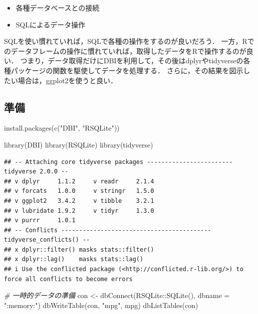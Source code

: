 \documentclass[
]{article}
\newenvironment{Shaded}{\begin{snugshade}}{\end{snugshade}}
\newcommand{\AttributeTok}[1]{\textcolor[rgb]{0.77,0.63,0.00}{#1}}
\newcommand{\CommentTok}[1]{\textcolor[rgb]{0.56,0.35,0.01}{\textit{#1}}}
\newcommand{\FunctionTok}[1]{\textcolor[rgb]{0.00,0.00,0.00}{#1}}
\newcommand{\NormalTok}[1]{#1}
\newcommand{\OtherTok}[1]{\textcolor[rgb]{0.56,0.35,0.01}{#1}}
\newcommand{\SpecialCharTok}[1]{\textcolor[rgb]{0.00,0.00,0.00}{#1}}
\newcommand{\StringTok}[1]{\textcolor[rgb]{0.31,0.60,0.02}{#1}}
\providecommand{\tightlist}{%
  \setlength{\itemsep}{0pt}\setlength{\parskip}{0pt}}
\begin{document}
\begin{itemize}
\tightlist
\item
  各種データベースとの接続\\
\item
  SQLによるデータ操作
\end{itemize}

SQLを使い慣れていれば，SQLで各種の操作をするのが良いだろう．
一方，Rでのデータフレームの操作に慣れていれば，取得したデータをRで操作するのが良い．
つまり，データ取得だけにDBIを利用して，その後はdplyrやtidyverseの各種パッケージの関数を駆使してデータを処理する．
さらに，その結果を図示したい場合は，ggplot2を使うと良い．

\hypertarget{ux6e96ux5099-5}{%
\subsection{準備}\label{ux6e96ux5099-5}}

\begin{Shaded}
\begin{Highlighting}[]
\FunctionTok{install.packages}\NormalTok{(}\FunctionTok{c}\NormalTok{(}\StringTok{"DBI"}\NormalTok{, }\StringTok{"RSQLite"}\NormalTok{))}
\end{Highlighting}
\end{Shaded}

\begin{Shaded}
\begin{Highlighting}[]
\FunctionTok{library}\NormalTok{(DBI)}
\FunctionTok{library}\NormalTok{(RSQLite)}
\FunctionTok{library}\NormalTok{(tidyverse)}
\end{Highlighting}
\end{Shaded}

\begin{verbatim}
## -- Attaching core tidyverse packages ------------------------ tidyverse 2.0.0 --
## v dplyr     1.1.2     v readr     2.1.4
## v forcats   1.0.0     v stringr   1.5.0
## v ggplot2   3.4.2     v tibble    3.2.1
## v lubridate 1.9.2     v tidyr     1.3.0
## v purrr     1.0.1     
## -- Conflicts ------------------------------------------ tidyverse_conflicts() --
## x dplyr::filter() masks stats::filter()
## x dplyr::lag()    masks stats::lag()
## i Use the conflicted package (<http://conflicted.r-lib.org/>) to force all conflicts to become errors
\end{verbatim}

\begin{Shaded}
\begin{Highlighting}[]
  \CommentTok{\# 一時的データの準備}
\NormalTok{con }\OtherTok{\textless{}{-}} \FunctionTok{dbConnect}\NormalTok{(RSQLite}\SpecialCharTok{::}\FunctionTok{SQLite}\NormalTok{(), }\AttributeTok{dbname =} \StringTok{":memory:"}\NormalTok{)}
\FunctionTok{dbWriteTable}\NormalTok{(con, }\StringTok{"mpg"}\NormalTok{, mpg)}
\FunctionTok{dbListTables}\NormalTok{(con)}
\end{Highlighting}
\end{Shaded}
\end{document}

